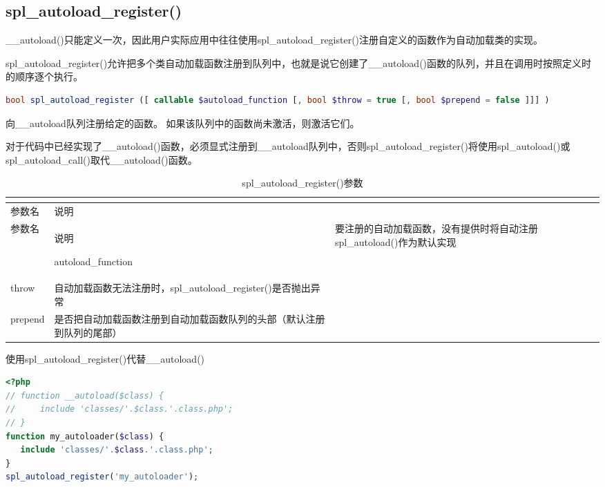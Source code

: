 \subsection{spl\_autoload\_register()}

\_\_autoload()只能定义一次，因此用户实际应用中往往使用spl\_autoload\_register()注册自定义的函数作为自动加载类的实现。

spl\_autoload\_register()允许把多个类自动加载函数注册到队列中，也就是说它创建了\_\_autoload()函数的队列，并且在调用时按照定义时的顺序逐个执行。




\begin{lstlisting}[language=PHP]
bool spl_autoload_register ([ callable $autoload_function [, bool $throw = true [, bool $prepend = false ]]] )
\end{lstlisting}

向\_\_autoload队列注册给定的函数。 如果该队列中的函数尚未激活，则激活它们。

对于代码中已经实现了\_\_autoload()函数，必须显式注册到\_\_autoload队列中，否则spl\_autoload\_register()将使用spl\_autoload()或spl\_autoload\_call()取代\_\_autoload()函数。


\begin{longtable}{|m{60pt}|m{200pt}|}
\tabularnewline\hline
参数名&说明
\endhead

\caption{spl\_autoload\_register()参数}\\
\hline
参数名&说明
\endfirsthead

\endfoot

\endlastfoot
\hline
autoload\_function&要注册的自动加载函数，没有提供时将自动注册spl\_autoload()作为默认实现\\
\hline
throw&自动加载函数无法注册时，spl\_autoload\_register()是否抛出异常\\
\hline
prepend&是否把自动加载函数注册到自动加载函数队列的头部（默认注册到队列的尾部）\\
\hline
\end{longtable}

\begin{example}
使用spl\_autoload\_register()代替\_\_autoload()
\begin{lstlisting}[language=PHP]
<?php
// function __autoload($class) {
//     include 'classes/'.$class.'.class.php';
// }
function my_autoloader($class) {
   include 'classes/'.$class.'.class.php';
}
spl_autoload_register('my_autoloader');
\end{lstlisting}
\end{example}

